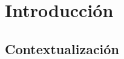 \documentclass[12pt,a4paper]{report}
\begin{document}
\tableofcontents



\chapter{Introducción}

%
%
%
%
%
%
%
%
%
%


\section{Contextualización}

%
%
%


\end{document}
